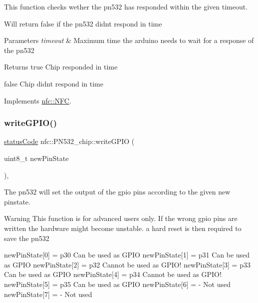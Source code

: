 This function checks wether the pn532 has responded within the given timeout. 

Will return false if the pn532 didnt respond in time 
\begin{DoxyParams}{Parameters}
{\em timeout} & Maximum time the arduino needs to wait for a response of the pn532 \\
\hline
\end{DoxyParams}
\begin{DoxyReturn}{Returns}
true Chip responded in time 

false Chip didnt respond in time 
\end{DoxyReturn}


Implements \hyperlink{classnfc_1_1NFC_a71585d021800a85b4a52a212d6313b1f}{nfc\+::\+N\+FC}.

\mbox{\label{classnfc_1_1PN532__chip_ad33f6bf96640bf7b10407e735ca57e2a}} 
\subsubsection{\texorpdfstring{write\+G\+P\+I\+O()}{writeGPIO()}}
{\footnotesize\ttfamily \hyperlink{declarations_8h_ae1d20c5a38cae82ccaa6a77be3fd264b}{status\+Code} nfc\+::\+P\+N532\+\_\+chip\+::write\+G\+P\+IO (\begin{DoxyParamCaption}\item[{uint8\+\_\+t}]{new\+Pin\+State }\end{DoxyParamCaption})\hspace{0.3cm}{\ttfamily [override]}, {\ttfamily [virtual]}}



The pn532 will set the output of the gpio pins according to the given new pinstate. 

\begin{DoxyWarning}{Warning}
This function is for advanced users only. If the wrong gpio pins are written the hardware might become unstable. a hard reset is then required to save the pn532
\end{DoxyWarning}
new\+Pin\+State\mbox{[}0\mbox{]} = p30 Can be used as G\+P\+IO new\+Pin\+State\mbox{[}1\mbox{]} = p31 Can be used as G\+P\+IO new\+Pin\+State\mbox{[}2\mbox{]} = p32 Cannot be used as G\+P\+I\+O! new\+Pin\+State\mbox{[}3\mbox{]} = p33 Can be used as G\+P\+IO new\+Pin\+State\mbox{[}4\mbox{]} = p34 Cannot be used as G\+P\+I\+O! new\+Pin\+State\mbox{[}5\mbox{]} = p35 Can be used as G\+P\+IO new\+Pin\+State\mbox{[}6\mbox{]} = -\/ Not used new\+Pin\+State\mbox{[}7\mbox{]} = -\/ Not used

